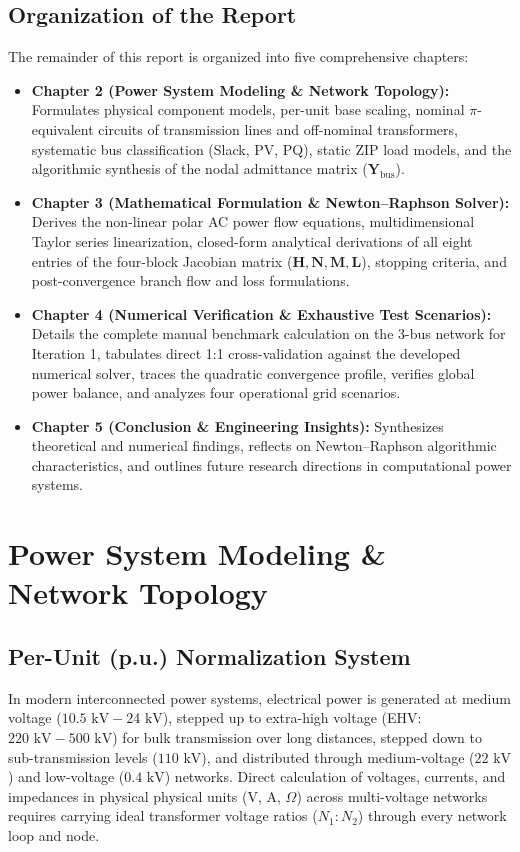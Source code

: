 \documentclass[12pt,a4paper,oneside]{report}
\begin{document}
\section{Organization of the Report}
The remainder of this report is organized into five comprehensive chapters:
\begin{itemize}
    \item \textbf{Chapter 2 (Power System Modeling \& Network Topology):} Formulates physical component models, per-unit base scaling, nominal $\pi$-equivalent circuits of transmission lines and off-nominal transformers, systematic bus classification (Slack, PV, PQ), static ZIP load models, and the algorithmic synthesis of the nodal admittance matrix ($\mathbf{Y}_{\text{bus}}$).
    \item \textbf{Chapter 3 (Mathematical Formulation \& Newton--Raphson Solver):} Derives the non-linear polar AC power flow equations, multidimensional Taylor series linearization, closed-form analytical derivations of all eight entries of the four-block Jacobian matrix ($\mathbf{H}, \mathbf{N}, \mathbf{M}, \mathbf{L}$), stopping criteria, and post-convergence branch flow and loss formulations.
    \item \textbf{Chapter 4 (Numerical Verification \& Exhaustive Test Scenarios):} Details the complete manual benchmark calculation on the 3-bus network for Iteration 1, tabulates direct 1:1 cross-validation against the developed numerical solver, traces the quadratic convergence profile, verifies global power balance, and analyzes four operational grid scenarios.
    \item \textbf{Chapter 5 (Conclusion \& Engineering Insights):} Synthesizes theoretical and numerical findings, reflects on Newton--Raphson algorithmic characteristics, and outlines future research directions in computational power systems.
\end{itemize}

\chapter{Power System Modeling \& Network Topology}

\section{Per-Unit (p.u.) Normalization System}
In modern interconnected power systems, electrical power is generated at medium voltage ($10.5\text{ kV} - 24\text{ kV}$), stepped up to extra-high voltage (EHV: $220\text{ kV} - 500\text{ kV}$) for bulk transmission over long distances, stepped down to sub-transmission levels ($110\text{ kV}$), and distributed through medium-voltage ($22\text{ kV}$) and low-voltage ($0.4\text{ kV}$) networks. Direct calculation of voltages, currents, and impedances in physical physical units (V, A, $\Omega$) across multi-voltage networks requires carrying ideal transformer voltage ratios ($N_1 : N_2$) through every network loop and node.
\end{document}
